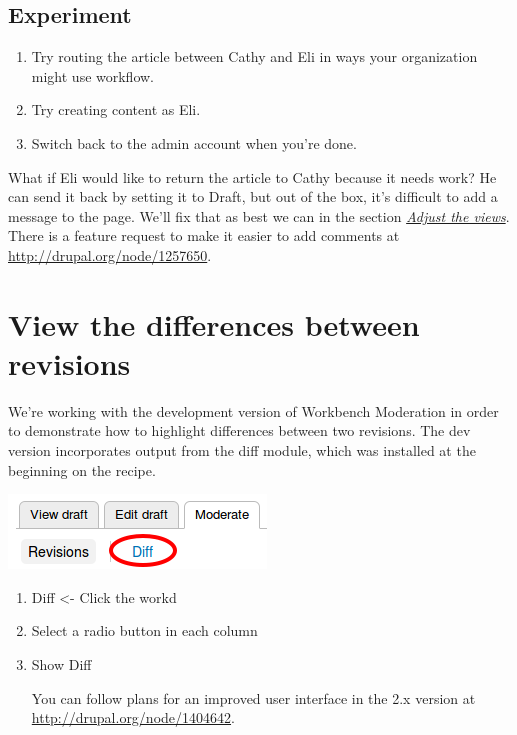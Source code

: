 \documentclass[letterpaper,10pt,english]{sphinxmanual}
\begin{document}
\section{Experiment}
\label{moderation:experiment}\begin{enumerate}
\item {} 
Try routing the article between Cathy and Eli in ways your organization might use workflow.

\item {} 
Try creating content as Eli.

\item {} 
Switch back to the admin account when you're done.

\end{enumerate}

What if Eli would like to return the article to Cathy because it needs work? He can send it back by setting it to Draft, but out of the box, it's difficult to add a message to the page. We'll fix that as best we can in the section {\hyperref[moderation:views]{\emph{Adjust the views}}}. There is a feature request to make it easier to add comments at \href{http://drupal.org/node/1257650}{http://drupal.org/node/1257650}.


\chapter{View the differences between revisions}
\label{moderation:view-the-differences-between-revisions}
We're working with the development version of Workbench Moderation in order to demonstrate how to highlight differences between two revisions. The dev version incorporates output from the diff module, which was installed at the beginning on the recipe.

\includegraphics{sites/default/files/recipes/moderation/diff.png}
\begin{enumerate}
\item {} 
Diff \textless{}- Click the workd

\item {} 
Select a radio button in each column

\item {} 
Show Diff

You can follow plans for an improved user interface in the 2.x version at \href{http://drupal.org/node/1404642}{http://drupal.org/node/1404642}.

\end{enumerate}
\end{document}
